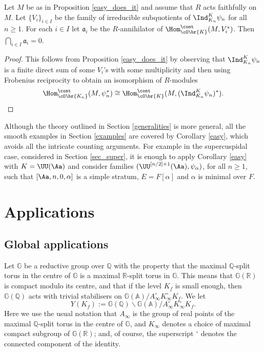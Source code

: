 \begin{cor}\label{easy} Let
$M$ be as in Proposition \ref{easy_does_it} and assume that $R$ acts faithfully on $M$. Let $\{ V_i\}_{i\in I}$ be the family of irreducible subquotients of $\Ind_{K_n}^K \psi_n$ for all $n\ge 1$. For each $i\in I$ let $\mathfrak a_i$ be the $R$-annihilator of
$\Hom_{\cO\br{K}}^{\cont}(M, V_i^*)$. Then $\bigcap_{i\in I} \mathfrak a _i=0$.
\end{cor}

\begin{proof} This follows from Proposition \ref{easy_does_it} by observing that $\Ind_{K_n}^K \psi_n$ is a finite direct
sum of some $V_i$'s with some multiplicity and then using Frobenius reciprocity to obtain an isomorphism of $R$-modules
\[
\Hom^{\cont}_{\cO\br{K_n}}(M, \psi_n^*)\cong \Hom_{\cO\br{K}}^{\cont}(M, (\Ind_{K_n}^K \psi_n)^*).\qedhere
\]
\end{proof}

\begin{remark} Although the theory outlined in Section \ref{generalities} is more general,
all the smooth examples in Section \ref{examples} are covered by Corollary \ref{easy},
which avoids all the intricate counting arguments. For example in the supercuspidal case,
considered in Section \ref{sec_super}, it is enough to apply Corollary \ref{easy} with $K=\UU(\Aa)$ and
consider families $(\UU^{[n/2]+1}(\Aa), \psi_{\alpha})$, for all $n\ge 1$, such that $[\Aa, n, 0, \alpha]$
is a simple stratum, $E=F[\alpha]$ and $\alpha$ is minimal over $F$.
\end{remark}

\section{Applications}\label{sec_appl}

\subsection{Global applications}\label{global}

Let $\mathbb G$ be a reductive group over $\mathbb Q$ with the property
that the maximal $\mathbb Q$-split torus in the centre
of $\mathbb G$ is a maximal $\mathbb R$-split torus in $\mathbb G$.
This means that $\mathbb G(\mathbb R)$ is compact modulo its centre,
and that if the level $K_f$ is small enough, then
$\mathbb G(\mathbb Q)$ acts with trivial stabilisers
on $\mathbb G(\mathbb A)/A_{\infty}^{\circ} K_{\infty}^{\circ} K_f.$ We
let
\[
Y(K_f):= \mathbb G(\mathbb Q)\backslash\mathbb G(\mathbb A)/A_{\infty}^{\circ} K_{\infty}^{\circ} K_f.
\]
Here we use the usual notation that $A_{\infty}$ is the group
of real points of the maximal $\mathbb Q$\nobreakdash-split torus in the
centre of $\mathbb G$, and $K_{\infty}$ denotes
a choice of maximal compact subgroup of $\mathbb G(\mathbb R)$;
and, of course, the superscript ${}^{\circ}$ denotes the connected
component of the identity.

